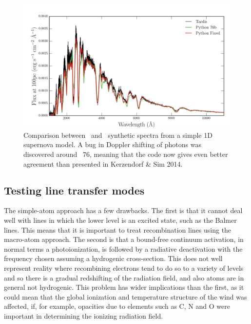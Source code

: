 \begin{figure}
\centering
\includegraphics[width=1.0\textwidth]{figures/03-radtrans/tardispython_thesis.png}
\caption[Comparison between \tar\ and \py\ synthetic spectra from 
a simple 1D supernova model.]
{
Comparison between \tar\ and \py\ synthetic spectra from 
a simple 1D supernova model. A bug in Doppler shifting of
photons was discovered around \py\ 76, meaning that the code now gives
even better agreement than presented in Kerzendorf \& Sim 2014.
}
\label{fig:tardis_spec}
\end{figure}

\subsection{Testing line transfer modes}
\label{sec:line_test}
The simple-atom approach has a few drawbacks. The first is that it cannot
deal well with lines in which the lower level is an excited state, such as the 
Balmer lines. This means that it is important to treat recombination lines using the 
macro-atom approach. The second is that a bound-free continuum activation, 
in normal terms a photoionization, is followed by a radiative deactivation
with the frequency chosen assuming a hydrogenic cross-section. 
This does not well represent reality where recombining
electrons tend to do so to a variety of levels and so there is a gradual
redshifting of the radiation field, and also atoms are in general not hydrogenic. 
This problem has wider implications than
the first, as it could mean that the global ionization and temperature structure of the wind
was affected, if, for example, opacities due to elements such as C, N and O were important
in determining the ionizing radiation field.

